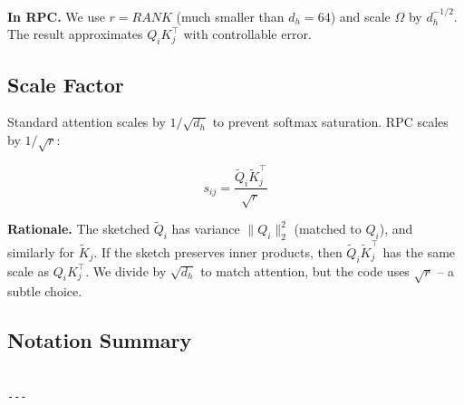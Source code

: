 \textbf{In RPC.} We use $r = {{RANK}}$ (much smaller than $d_h = 64$) and scale 
$\Omega$ by $d_h^{-1/2}$. The result approximates $Q_i K_j^\top$ with 
controllable error.

\subsection{Scale Factor}

Standard attention scales by $1/\sqrt{d_h}$ to prevent softmax saturation. 
RPC scales by $1/\sqrt{r}$:

\[
s_{ij} = \frac{\tilde{Q}_i \tilde{K}_j^\top}{\sqrt{r}}
\tag{3.6}
\]

\textbf{Rationale.} The sketched $\tilde{Q}_i$ has variance $\|Q_i\|_2^2$ 
(matched to $Q_i$), and similarly for $\tilde{K}_j$. If the sketch preserves 
inner products, then $\tilde{Q}_i \tilde{K}_j^\top$ has the same scale as 
$Q_i K_j^\top$. We divide by $\sqrt{d_h}$ to match attention, but the code 
uses $\sqrt{r}$ -- a subtle choice.

\subsection{Notation Summary}

\begin{lstlisting}

---
\end{lstlisting}